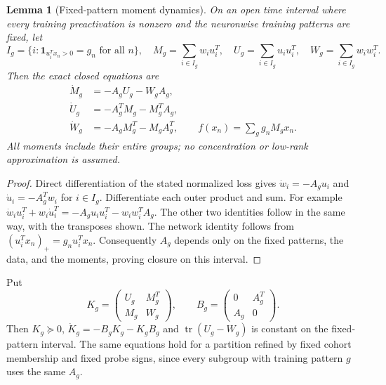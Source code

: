 \documentclass[10pt]{article}
\newtheorem{lemma}[theorem]{Lemma}
\begin{document}
\begin{lemma}[Fixed-pattern moment dynamics]\label{lem:pattern-quotient}
On an open time interval where every training preactivation is nonzero
and the neuronwise training patterns are fixed, let
\[
 I_g=\{i:\mathbf1_{u_i^Tx_n>0}=g_n\text{ for all }n\},\quad
 M_g=\sum_{i\in I_g}w_iu_i^T,\quad
 U_g=\sum_{i\in I_g}u_iu_i^T,\quad
 W_g=\sum_{i\in I_g}w_iw_i^T.
\]
Then the exact closed equations are
\begin{align*}
 \dot M_g&=-A_gU_g-W_gA_g,\\
 \dot U_g&=-A_g^TM_g-M_g^TA_g,\\
 \dot W_g&=-A_gM_g^T-M_gA_g^T,
 \qquad f(x_n)=\sum_g g_nM_gx_n.
\end{align*}
All moments include their entire groups; no concentration or low-rank
approximation is assumed.
\end{lemma}
\begin{proof}
Direct differentiation of the stated normalized loss gives
$\dot w_i=-A_gu_i$ and $\dot u_i=-A_g^Tw_i$ for $i\in I_g$.
Differentiate each outer product and sum. For example
$\dot w_iu_i^T+w_i\dot u_i^T=-A_gu_iu_i^T-w_iw_i^TA_g$.
The other two identities follow in the same way, with the transposes shown.
The network identity follows from $(u_i^Tx_n)_+=g_nu_i^Tx_n$.
Consequently $A_g$ depends only on the fixed patterns, the data, and the
moments, proving closure on this interval.
\end{proof}

Put
\[
 K_g=\begin{pmatrix}U_g&M_g^T\\M_g&W_g\end{pmatrix},\qquad
 B_g=\begin{pmatrix}0&A_g^T\\A_g&0\end{pmatrix}.
\]
Then $K_g\succeq0$, $\dot K_g=-B_gK_g-K_gB_g$ and
$\operatorname{tr}(U_g-W_g)$ is constant on the fixed-pattern interval.
The same equations hold for a partition refined by fixed cohort membership
and fixed probe signs, since every subgroup with training pattern $g$
uses the same $A_g$.
\end{document}
